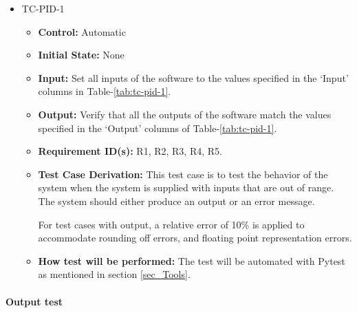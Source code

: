 \documentclass[12pt, titlepage]{article}
\begin{document}
\begin{itemize}
\item{TC-PID-1\\}
\begin{itemize}

\item{\textbf{Control:}} Automatic
					
\item{\textbf{Initial State:}} None
					
\item{\textbf{Input:}} Set all inputs of the software to the values specified in the 
`Input' columns in Table-\ref{tab:tc-pid-1}.
					
\item{\textbf{Output:}}  Verify that all the outputs of the software match the 
values specified in the `Output' columns of Table-\ref{tab:tc-pid-1}.


\item{\textbf{Requirement ID(s):}}  R1, R2, R3, R4, R5.

\item{\textbf{Test Case Derivation:}}  This test case is to test the behavior of the system 
when the system is supplied with inputs that are out of range. The system should either
produce an output or an error message. 

For test cases with output, a relative error of 10\% is applied to accommodate rounding off errors,
and floating point representation errors.

					
\item{\textbf{How test will be performed:}}  The test will be automated with Pytest as mentioned in 
section \ref{sec_Tools}. 
					
\end{itemize}
\end{itemize}

\paragraph{Output test}
\end{document}
